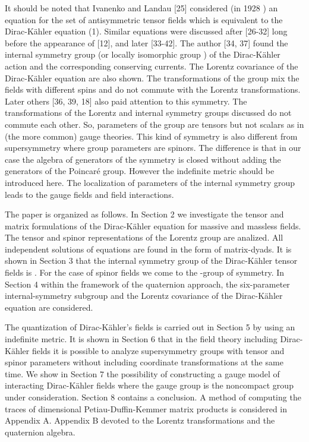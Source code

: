 \documentclass[a4paper,12pt]{article}
\begin{document}
It should be noted that Ivanenko and Landau [25] considered (in 1928 ) an
equation for the set of antisymmetric tensor fields which is equivalent to
the Dirac-K\"ahler equation (1). Similar equations were discussed after
[26-32] long before the appearance of [12], and later [33-42]. The author
[34, 37] found the internal symmetry group \coordHE{} (or locally isomorphic
group \coordHE{}) of the Dirac-K\"ahler action and the corresponding
conserving currents. The Lorentz covariance of the Dirac-K\"ahler equation
are also shown. The transformations of the \coordHE{} group mix the fields
with different spins and do not commute with the Lorentz transformations.
Later others [36, 39, 18] also paid attention to this symmetry. The
transformations of the Lorentz and internal symmetry groups discussed do not
commute each other. So, parameters of the group are tensors but not scalars
as in (the more common) gauge theories. This kind of symmetry is also
different from supersymmetry where group parameters are spinors. The
difference is that in our case the algebra of generators of the symmetry is
closed without adding the generators of the Poincar\'e group. However the
indefinite metric should be introduced here. The localization of parameters
of the internal symmetry group leads to the gauge fields and field
interactions.

The paper is organized as follows. In Section 2 we investigate the tensor
and matrix formulations of the Dirac-K\"ahler equation for massive and
massless fields. The tensor and spinor representations of the Lorentz group
are analized. All independent solutions of equations are found in the form
of matrix-dyads. It is shown in Section 3 that the internal symmetry group
of the Dirac-K\"ahler tensor fields is \coordHE{}. For the case of spinor
fields we come to the \coordHE{}-group of symmetry. In Section 4 within the
framework of the quaternion approach, the six-parameter internal-symmetry
subgroup and the Lorentz covariance of the Dirac-K\"ahler equation are
considered.

The quantization of Dirac-K\"ahler's fields is carried out in Section 5 by
using an indefinite metric. It is shown in Section 6 that in the field
theory including Dirac-K\"ahler fields it is possible to analyze
supersymmetry groups with tensor and spinor parameters without including
coordinate transformations at the same time. We show in Section 7 the
possibility of constructing a gauge model of interacting Dirac-K\"ahler
fields where the gauge group is the noncompact group \coordHE{} under
consideration. Section 8 contains a conclusion. A method of computing the
traces of \coordHE{}dimensional Petiau-Duffin-Kemmer matrix products is
considered in Appendix A. Appendix B devoted to the Lorentz transformations
and the quaternion algebra.
\end{document}
